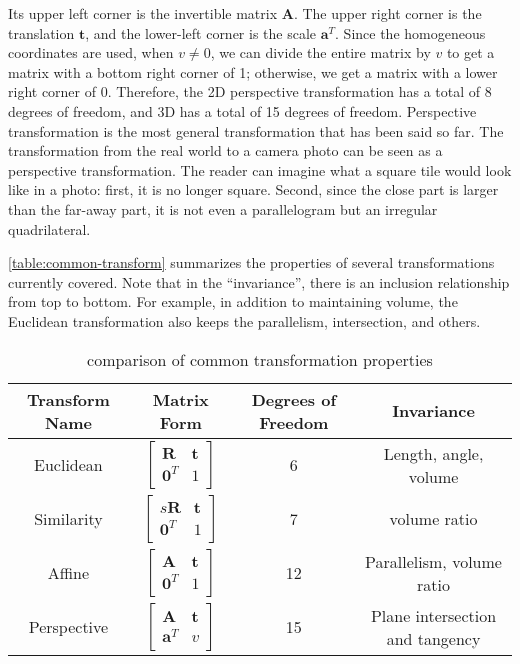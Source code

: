 \begin{enumerate}
	Its upper left corner is the invertible matrix $\mathbf{A}$. The upper right corner is the translation $\mathbf{t}$, and the lower-left corner is the scale $\mathbf{a}^T$. Since the homogeneous coordinates are used, when $v \neq 0$, we can divide the entire matrix by $v$ to get a matrix with a bottom right corner of 1; otherwise, we get a matrix with a lower right corner of $0$. Therefore, the 2D perspective transformation has a total of 8 degrees of freedom, and 3D has a total of 15 degrees of freedom. Perspective transformation is the most general transformation that has been said so far. The transformation from the real world to a camera photo can be seen as a perspective transformation. The reader can imagine what a square tile would look like in a photo: first, it is no longer square. Second, since the close part is larger than the far-away part, it is not even a parallelogram but an irregular quadrilateral. 
\end{enumerate}

\autoref{table:common-transform} summarizes the properties of several transformations currently covered. Note that in the ``invariance'', there is an inclusion relationship from top to bottom. For example, in addition to maintaining volume, the Euclidean transformation also keeps the parallelism, intersection, and others.

\begin{table}[!htp]
	\centering
	\caption{comparison of common transformation properties}
	\label{table:common-transform}
	\small
	\begin{tabular}{c|c|c|c}
		\toprule
		Transform Name & Matrix Form & Degrees of Freedom & Invariance \\ \midrule
		Euclidean \rule{0pt}{20 pt} & $\left[ {\begin{array}{*{20}{c}}
			\mathbf{R} & \mathbf{t}\\
			{{\mathbf{0}^T}}&1
			\end{array}} \right]$ & 6 & Length, angle, volume \\
		Similarity \rule{0pt}{20 pt}& $ \left[ {\begin{array}{*{20}{c}}
			{s \mathbf{R}}& \mathbf{t}\\
			{{ \mathbf{0}^T}}&1
			\end{array}} \right]$ & 7 & volume ratio \\
		Affine \rule{0pt}{20 pt}& $ \left[ {\begin{array}{*{20}{c}}
			\mathbf{A} & \mathbf{t}\\
			{{\mathbf{0}^T}} & 1
			\end{array}} \right]$ & 12 & Parallelism, volume ratio \\
		Perspective \rule{0pt}{20 pt} & $ \left[ {\begin{array}{*{20}{c}}
			\mathbf{A} & \mathbf{t}\\
			{{\mathbf{a}^T}} & v
			\end{array}} \right]$ & 15 & Plane intersection and tangency \rule{0pt}{20 pt}\\
		\bottomrule
	\end{tabular}
\end{table}

